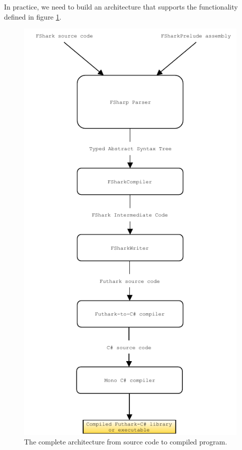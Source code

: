 In practice, we need to build an architecture that supports the functionality
defined in figure \ref{fig:fsharkcompilerarchitecture}.

\begin{figure}[H]
  \centering
  \includegraphics[scale=1.15]{chapters/figs/compilerarchitecture.pdf}
  \caption{The complete architecture from \fshark{} source code to compiled
    \csharp{} program.}
  \label{fig:fsharkcompilerarchitecture}
\end{figure}


